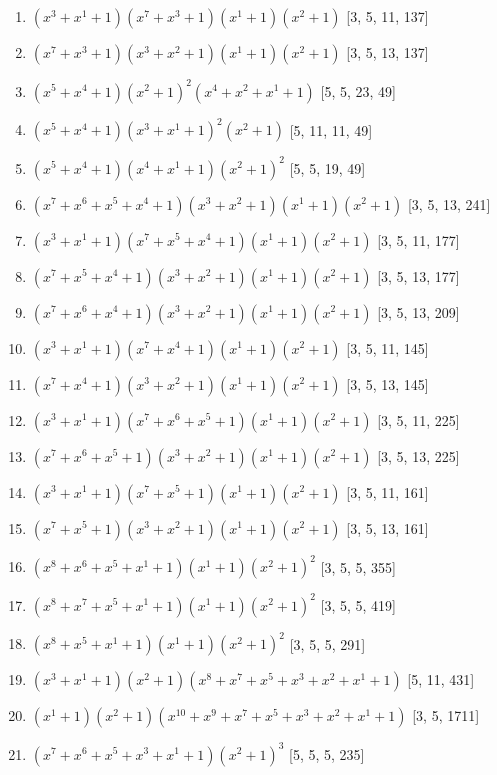 \documentclass[10pt,twocolumn]{article}
\begin{document}
\begin{enumerate}
\item $(x^{3} + x^{1} + 1)(x^{7} + x^{3} + 1)(x^{1} + 1)(x^{2} + 1)$  [3, 5, 11, 137]
\item $(x^{7} + x^{3} + 1)(x^{3} + x^{2} + 1)(x^{1} + 1)(x^{2} + 1)$  [3, 5, 13, 137]
\item $(x^{5} + x^{4} + 1)(x^{2} + 1)^{2}(x^{4} + x^{2} + x^{1} + 1)$  [5, 5, 23, 49]
\item $(x^{5} + x^{4} + 1)(x^{3} + x^{1} + 1)^{2}(x^{2} + 1)$  [5, 11, 11, 49]
\item $(x^{5} + x^{4} + 1)(x^{4} + x^{1} + 1)(x^{2} + 1)^{2}$  [5, 5, 19, 49]
\item $(x^{7} + x^{6} + x^{5} + x^{4} + 1)(x^{3} + x^{2} + 1)(x^{1} + 1)(x^{2} + 1)$  [3, 5, 13, 241]
\item $(x^{3} + x^{1} + 1)(x^{7} + x^{5} + x^{4} + 1)(x^{1} + 1)(x^{2} + 1)$  [3, 5, 11, 177]
\item $(x^{7} + x^{5} + x^{4} + 1)(x^{3} + x^{2} + 1)(x^{1} + 1)(x^{2} + 1)$  [3, 5, 13, 177]
\item $(x^{7} + x^{6} + x^{4} + 1)(x^{3} + x^{2} + 1)(x^{1} + 1)(x^{2} + 1)$  [3, 5, 13, 209]
\item $(x^{3} + x^{1} + 1)(x^{7} + x^{4} + 1)(x^{1} + 1)(x^{2} + 1)$  [3, 5, 11, 145]
\item $(x^{7} + x^{4} + 1)(x^{3} + x^{2} + 1)(x^{1} + 1)(x^{2} + 1)$  [3, 5, 13, 145]
\item $(x^{3} + x^{1} + 1)(x^{7} + x^{6} + x^{5} + 1)(x^{1} + 1)(x^{2} + 1)$  [3, 5, 11, 225]
\item $(x^{7} + x^{6} + x^{5} + 1)(x^{3} + x^{2} + 1)(x^{1} + 1)(x^{2} + 1)$  [3, 5, 13, 225]
\item $(x^{3} + x^{1} + 1)(x^{7} + x^{5} + 1)(x^{1} + 1)(x^{2} + 1)$  [3, 5, 11, 161]
\item $(x^{7} + x^{5} + 1)(x^{3} + x^{2} + 1)(x^{1} + 1)(x^{2} + 1)$  [3, 5, 13, 161]
\item $(x^{8} + x^{6} + x^{5} + x^{1} + 1)(x^{1} + 1)(x^{2} + 1)^{2}$  [3, 5, 5, 355]
\item $(x^{8} + x^{7} + x^{5} + x^{1} + 1)(x^{1} + 1)(x^{2} + 1)^{2}$  [3, 5, 5, 419]
\item $(x^{8} + x^{5} + x^{1} + 1)(x^{1} + 1)(x^{2} + 1)^{2}$  [3, 5, 5, 291]
\item $(x^{3} + x^{1} + 1)(x^{2} + 1)(x^{8} + x^{7} + x^{5} + x^{3} + x^{2} + x^{1} + 1)$  [5, 11, 431]
\item $(x^{1} + 1)(x^{2} + 1)(x^{10} + x^{9} + x^{7} + x^{5} + x^{3} + x^{2} + x^{1} + 1)$  [3, 5, 1711]
\item $(x^{7} + x^{6} + x^{5} + x^{3} + x^{1} + 1)(x^{2} + 1)^{3}$  [5, 5, 5, 235]

\end{enumerate}
\end{document}
